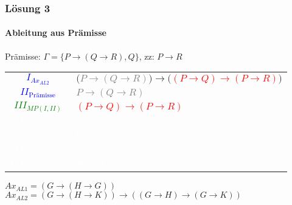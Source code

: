 \begin{frame}
	\frametitle{Lösung 3}
	\framesubtitle{Ableitung aus Prämisse}
	Prämisse: $\Gamma =\{P\rightarrow(Q\rightarrow R), Q\}$, zz: $P\rightarrow R$\\
	\begin{tabular}{cl}
		\textcolor{blue}{$I_{Ax_{AL2}}$}          & $($\textcolor{gray}{$P\rightarrow(Q\rightarrow R)$}$)\rightarrow($\textcolor{red}{$(P\rightarrow Q)\rightarrow(P\rightarrow R)$}$)$ \\
		\textcolor{blue}{$II_{\text{Prämisse}}$}  & \textcolor{gray}{$P\rightarrow(Q\rightarrow R)$}                                                                                    \\
		\textcolor{green}{$III_{MP(I, II)}$}      & \textcolor{red}{$(P\rightarrow Q)\rightarrow(P\rightarrow R)$}                                                                      \\
		\textcolor{white}{$IV_{\text{Prämisse}}$} & \textcolor{white}{$Q$}                                                                                                              \\
		\textcolor{white}{$V_{IV, Ax_{AL1}}$}     & \textcolor{white}{$Q\rightarrow(P\rightarrow Q)$}                                                                                   \\
		\textcolor{white}{$VI_{MP(IV, V)}$}       & \textcolor{white}{$P\rightarrow Q$}                                                                                                 \\
		\textcolor{white}{$VII_{MP(III, VI)}$}    & \textcolor{white}{$P\rightarrow R$}                                                                                                 \\
	\end{tabular}
	$Ax_{AL1} = (G\rightarrow(H\rightarrow G))$\\
	$Ax_{AL2} = (G\rightarrow(H\rightarrow K))\rightarrow((G\rightarrow H)\rightarrow(G\rightarrow K))$\\
\end{frame}
